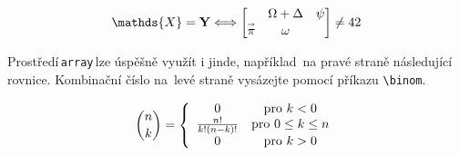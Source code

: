 \documentclass [11pt, a4paper, twocolumn] {article}
\begin{document}
    \[
        \mathds{X} =  \mathbf{Y} \Longleftrightarrow 
    \begin{bmatrix}
         & \Omega  +\Delta & {\psi}  \\
        \overset{\shortrightarrow}{\pi} & \omega & \\
    
    \end{bmatrix}
    \neq 42 \]
    

Prostředí\,\verb|array|\,lze úspěšně využít i jinde, například~na pravé straně následující rovnice. 
Kombinační číslo na~levé straně vysázejte pomocí příkazu \verb|\binom|.

$$
\binom{n}{k} =
\left\{
    \begin{array}{ccc}
        0 & \textnormal{pro } k < 0\\
        \frac{n!}{k! (n - k)!} & \textnormal{pro } 0 \leq k \leq n \\
        0 & \textnormal{pro } k > 0 \\
    \end{array}
    \right.
$$
\end{document}
